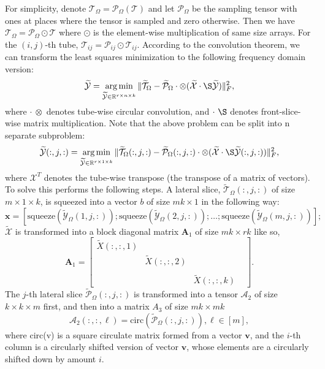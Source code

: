 \documentclass[format=acmsmall, review=false, screen=true]{acmart}
\begin{document}
For simplicity, denote
$\mathcal{T}_{\Omega} = \mathcal{P}_{\Omega}(\mathcal{T})$ and let
$\mathcal{P}_{\Omega}$ be the sampling tensor with ones at places where the tensor is
sampled and zero otherwise. Then we have $\mathcal{T}_{\Omega} = \mathcal{P}_{\Omega}\odot \mathcal{T}$ where $\odot$ is the element-wise multiplication of same
size arrays. For the $(i, j)$-th tube, $\mathcal{T}_{ij}=\mathcal{P}_{ij}\odot \mathcal{T}_{ij}$. According to the convolution theorem, we can transform the least squares minimization to the following frequency domain version:
\[
    \widetilde{\mathcal{Y}} = \mathop{ \arg \min}_{\widetilde{\mathcal{Y}} \in \mathbb{R}^{r \times n \times k}} \| \widetilde{\mathcal{T}}_{\Omega} -  \widetilde{\mathcal{P}}_{\Omega} \cdot \otimes (\widetilde{\mathcal{X}} \cdot \S  \widetilde{\mathcal{Y}}) \| ^2_F,
\]
where $\cdot \ \otimes$ denotes tube-wise circular convolution,
and $\cdot \ \S $ denotes front-slice-wise matrix multiplication. Note that
the above problem can be split into n separate subproblem:
\[
    \widetilde{\mathcal{Y}}(:, j, :) = \mathop{\arg \min}_{\widetilde{\mathcal{Y}} \in \mathbb{R}^{r \times 1 \times k}} \| \widetilde{\mathcal{T}}_{\Omega}(:, j, :) -  \widetilde{\mathcal{P}}_{\Omega}(:, j, :) \cdot \otimes (\widetilde{\mathcal{X}} \cdot \S \widetilde{\mathcal{Y}}(:, j, :)) \|^2_F,
\]
where $\mathcal{X}^T$ denotes the tube-wise transpose (the transpose of a matrix of vectors). To solve this performs the following steps. A lateral slice, $\widetilde{\mathcal{T}}_{\Omega}(:, j, :)$ of
size $m \times 1 \times k$, is squeezed into a vector $b$ of size
$mk \times 1$ in the following way:
\[
\mathbf{x} = [\mathrm{squeeze}(\widetilde{\mathcal{Y}}_{\Omega}(1, j, :)); \mathrm{squeeze}(\widetilde{\mathcal{Y}}_{\Omega}(2, j, :)); \dots; \mathrm{squeeze}(\widetilde{\mathcal{Y}}_{\Omega}(m, j, :))];
\]
$\widetilde{\mathcal{X}}$ is transformed into a block diagonal matrix $\mathbf{A}_1$
of size $mk \times rk$ like so,
\[
\mathbf{A}_1 =
\begin{bmatrix}
    \widetilde{X}(:, :, 1) & & \\
    & \widetilde{X}(:, :, 2) & \\
    & & & \\
    & & \widetilde{X}(:, :, k)
\end{bmatrix} .
\]
The $j$-th lateral slice $\widetilde{\mathcal{P}}_{\Omega}(:, j, :)$ is transformed into a tensor $\mathcal{A}_2$ of size $k \times k \times m$ first,
and then into a matrix $A_3$ of size $mk \times mk$
\[
\mathcal{A}_2(:, :, \ell) = \mathrm{circ}(\widetilde{\mathcal{P}}_{\Omega}(:, j, :)), \ell \in [m],
\]
where circ(v) is a square circulate matrix formed from a vector
$\mathbf{v}$, and the $i$-th column is a circularly shifted version
of vector $\mathbf v$, whose elements are a circularly shifted down by amount $i$.
\end{document}
